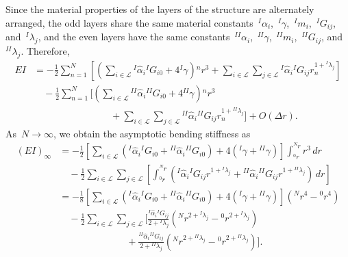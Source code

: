 \documentclass[preprint,10pt,times]{elsarticle}
\numberwithin{equation}{section}
\renewcommand{\>}{$\Rightarrow$}
\begin{document}
Since the material properties of the layers of the structure are alternately arranged, the odd layers share the same material constants~${}^{I}\!{\alpha_{i}}$,~${}^{I}\!\gamma$,~${}^{I}\!{m_{i}}$,~${}^{I}\!G_{ij}$, and~${}^{I}\!\lambda_{j}$, and the even layers have the same constants~${}^{II}\!{\alpha_{i}}$,~${}^{II}\!\gamma$,~${}^{II}\!{m_{i}}$,~${}^{II}\!G_{ij}$, and~${}^{II}\!\lambda_{j}$. Therefore,
\begin{equation}
\begin{aligned}
	EI & =  - \frac{1}{2} \sum_{n=1}^{N} \left[ \left( \sum_{i \in \mathcal{L}} {}^{I}\!\hat{\alpha}_{i} {}^{I}\!G_{i0} + 4{}^{I}\!\gamma \right) {}^{n}\!{r}^3+ \sum_{i \in \mathcal{L}} \sum_{j \in \mathcal{L}} {}^{I}\!\hat{\alpha}_{i} {}^{I}\!G_{ij} r^{1 + {}^{I}\!\lambda_{j}}_n \right] \\
	 & \quad - \frac{1}{2} \sum_{n=1}^{N} \biggr[ \left( \sum_{i \in \mathcal{L}} {}^{II}\!\hat{\alpha}_{i} {}^{II}\!G_{i0} + 4{}^{II}\!\gamma \right) {}^{n}\!{r}^3 \\
	  & \qquad \qquad \qquad \qquad + \sum_{i \in \mathcal{L}} \sum_{j \in \mathcal{L}} {}^{II}\!\hat{\alpha}_{i} {}^{II}\!G_{ij} r^{1 + {}^{II}\!\lambda_{j}}_n \biggr] + O(\Delta r).
\end{aligned}
\end{equation}
As~$N \to \infty$, we obtain the asymptotic bending stiffness as
\begin{equation}
\begin{aligned}
	(EI)_{\infty} & =  - \frac{1}{2} \left[ \sum_{i \in \mathcal{L}} \left( {}^{I}\!\hat{\alpha}_{i} {}^{I}\!G_{i0} + {}^{II}\!\hat{\alpha}_{i} {}^{II}\!G_{i0} \right) + 4\left( {}^{I}\!\gamma +{}^{II}\!\gamma \right) \right] \int_{{}^{0}\!{r}}^{{}^{N}\!{r}} r^3 \, dr \\
	& \quad - \frac{1}{2} \sum_{i \in \mathcal{L}} \sum_{j \in \mathcal{L}} \left[ \int_{{}^{0}\!{r}}^{{}^{N}\!{r}} \left( {}^{I}\!\hat{\alpha}_{i} {}^{I}\!G_{ij} r^{1 + {}^{I}\!\lambda_{j}} + {}^{II}\!\hat{\alpha}_{i} {}^{II}\!G_{ij}  r^{1 + {}^{II}\!\lambda_{j}} \right) \, dr \right] \\
	& = - \frac{1}{8} \left[ \sum_{i \in \mathcal{L}} \left( {}^{I}\!\hat{\alpha}_{i} {}^{I}\!G_{i0} + {}^{II}\!\hat{\alpha}_{i} {}^{II}\!G_{i0} \right) + 4\left( {}^{I}\!\gamma +{}^{II}\!\gamma \right) \right] \left( {}^{N}\!{r}^4 - {}^{0}\!{r}^4 \right) \\
	& \quad - \frac{1}{2} \sum_{i \in \mathcal{L}} \sum_{j \in \mathcal{L}} \biggr[ \frac{{}^{I}\!\hat{\alpha}_{i} {}^{I}\!G_{ij}}{2 + {}^{I}\!\lambda_{j} } \left( {}^{N}\!{r}^{2 + {}^{I}\!\lambda_{j}} - {}^{0}\!{r}^{2 + {}^{I}\!\lambda_{j}} \right) \\
	& \qquad \qquad \qquad \quad + \frac{{}^{II}\!\hat{\alpha}_{i} {}^{II}\!G_{ij}}{2 + {}^{II}\!\lambda_{j}} \left( {}^{N}\!{r}^{2 + {}^{II}\!\lambda_{j}} - {}^{0}\!{r}^{2 + {}^{II}\!\lambda_{j}} \right) \biggr] .
\end{aligned}
\label{eq:two_mat_no_slip_EI}
\end{equation}
\end{document}
